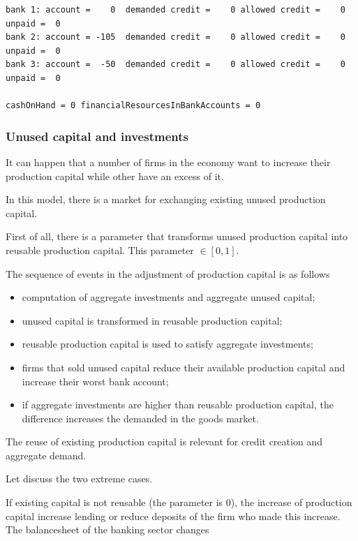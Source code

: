 \documentclass{article}
\begin{document}
\begin{verbatim}
bank 1: account =    0  demanded credit =    0 allowed credit =    0 unpaid =  0
bank 2: account = -105  demanded credit =    0 allowed credit =    0 unpaid =  0
bank 3: account =  -50  demanded credit =    0 allowed credit =    0 unpaid =  0

cashOnHand = 0 financialResourcesInBankAccounts = 0
\end{verbatim}





\subsubsection{Unused capital and investments}

It can happen that a number of firms in the economy want to increase their production capital while other have an excess of it.

In this model, there is a market for exchanging existing unused production capital.

First of all, there is a parameter that transforms unused production capital into reusable production capital.
This parameter $\in[0,1]$.

The sequence of events in the adjustment of production capital is as follows
\begin{itemize}
	\item computation of aggregate investments and aggregate unused capital;
	\item unused capital is transformed in reusable production capital;
	\item reusable production capital is used to satisfy aggregate investments;
	\item firms that sold unused capital reduce their available production capital and increase their worst bank account;
	\item if aggregate investments are higher than reusable production capital, the difference increases the demanded in the goods market. 
\end{itemize}

The reuse of existing production capital is relevant for credit creation and aggregate demand.

Let discuss the two extreme cases.

If existing capital is not reusable (the parameter is 0), the increase of production capital increase lending or reduce deposits of the firm who made this increase. The balancesheet of the banking sector changes
\end{document}
